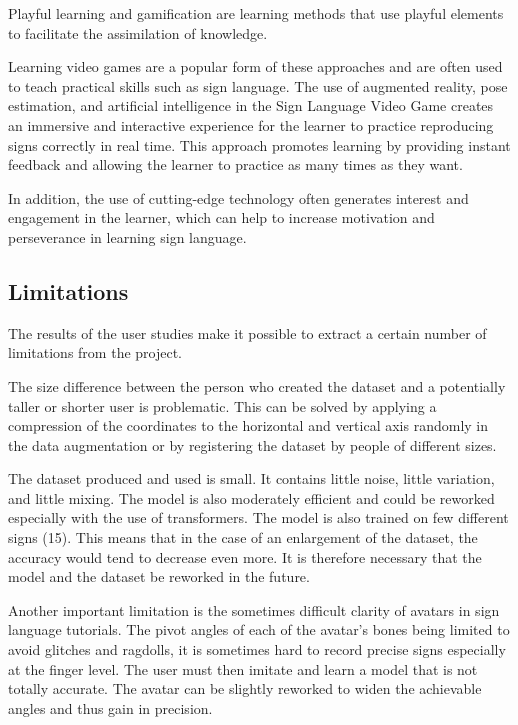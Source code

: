 Playful learning and gamification are learning methods that use playful elements to facilitate the assimilation of knowledge. 

Learning video games are a popular form of these approaches and are often used to teach practical skills such as sign language. The use of augmented reality, pose estimation, and artificial intelligence in the Sign Language Video Game creates an immersive and interactive experience for the learner to practice reproducing signs correctly in real time. 
This approach promotes learning by providing instant feedback and allowing the learner to practice as many times as they want. 

In addition, the use of cutting-edge technology often generates interest and engagement in the learner, which can help to increase motivation and perseverance in learning sign language.

\subsection{Limitations}

The results of the user studies make it possible to extract a certain number of limitations from the project.

The size difference between the person who created the dataset and a potentially taller or shorter user is problematic. This can be solved by applying a compression of the coordinates to the horizontal and vertical axis randomly in the data augmentation or by registering the dataset by people of different sizes.

The dataset produced and used is small. It contains little noise, little variation, and little mixing. The model is also moderately efficient and could be reworked especially with the use of transformers. The model is also trained on few different signs (15). This means that in the case of an enlargement of the dataset, the accuracy would tend to decrease even more. It is therefore necessary that the model and the dataset be reworked in the future.

Another important limitation is the sometimes difficult clarity of avatars in sign language tutorials. The pivot angles of each of the avatar's bones being limited to avoid glitches and ragdolls, it is sometimes hard to record precise signs especially at the finger level. The user must then imitate and learn a model that is not totally accurate. The avatar can be slightly reworked to widen the achievable angles and thus gain in precision.

